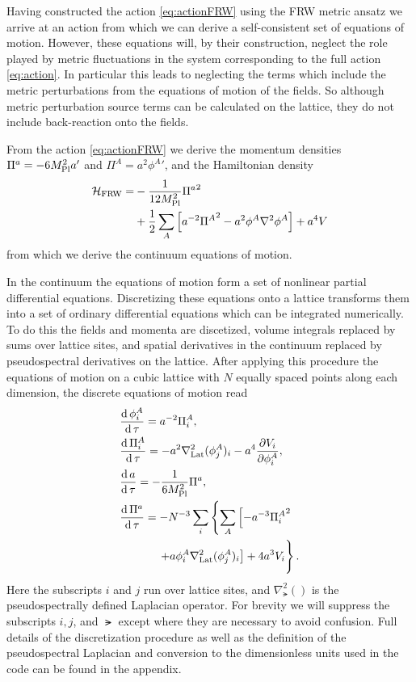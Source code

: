 Having constructed the action \eqref{eq:actionFRW} using the FRW metric ansatz we arrive at an action from which we can derive a self-consistent set of equations of motion. However, these equations will, by their construction, neglect the role played by metric fluctuations in the system corresponding to the full action \eqref{eq:action}. 
In particular this leads to neglecting the terms which include the metric perturbations from the equations of motion of the fields. So although metric perturbation source terms can be calculated on the lattice, they do not include back-reaction onto the fields.

From the action \eqref{eq:actionFRW} we derive the momentum densities $\Pi^a=-6M_{\mathrm{Pl}}^2a'$ and $\Pi^A=a^2{\phi^A}'$, and the Hamiltonian density
\begin{align} \label{eq:hamFRW}
  \begin{split}
    \mathcal{H}_\mathrm{FRW} = &-\frac{1}{12M_{\mathrm{Pl}}^2}{\Pi^a}^2 \\
    &+ \frac{1}{2}\sum_A\left[ a^{-2}{\Pi^A}^2 -a^2\phi^A\nabla^2\phi^A \right] +a^4V
    \end{split}
\end{align}
from which we derive the continuum equations of motion.

In the continuum the equations of motion form a set of nonlinear partial differential equations. Discretizing these equations onto a lattice transforms them into a set of ordinary differential equations which can be integrated numerically. To do this the fields and momenta are discetized, volume integrals replaced by sums over lattice sites, and spatial derivatives in the continuum replaced by pseudospectral derivatives on the lattice. After applying this procedure the equations of motion on a cubic lattice with $N$ equally spaced points along each dimension, the discrete equations of motion read
\begin{align}
  & \frac{\dd\phi^A_i}{\dd\tau} = a^{-2}\Pi^A_i,  \label{eq:lat eom phi}\\
  & \frac{\dd\Pi^A_i}{\dd\tau} = -a^2\nabla^2_\lat(\phi^A_j)_i -a^4\frac{\partial V_i}{\partial \phi^A_i},  \label{eq:lat eom pi phi}\\
  & \frac{\dd a}{\dd\tau} = -\frac{1}{6\mpl^2}\Pi^a,  \label{eq:lat eom a} \\
  & \frac{\dd\Pi^a}{\dd\tau} = -N^{-3}\sum_i\left\{ \sum_A\left[-a^{-3}{\Pi^A_i}^2 \right.\right. \nonumber \\
    & \hphantom{\frac{\dd\Pi^a}{\dd\tau} = } \left.\left. + a\phi^A_i\nabla^2_\lat(\phi^A_j)_i \right] + 4a^3V_i\vphantom{\sum_A}\right\}. \label{eq:lat eom pi a}  
\end{align}
Here the subscripts $i$ and $j$ run over lattice sites, and $\nabla^2_\lat()$ is the pseudospectrally defined Laplacian operator.
For brevity we will suppress the subscripts $i,j$, and $\lat$ except where they are necessary to avoid confusion.
Full details of the discretization procedure as well as the definition of the pseudospectral Laplacian and conversion to the dimensionless units used in the code can be found in the appendix.

